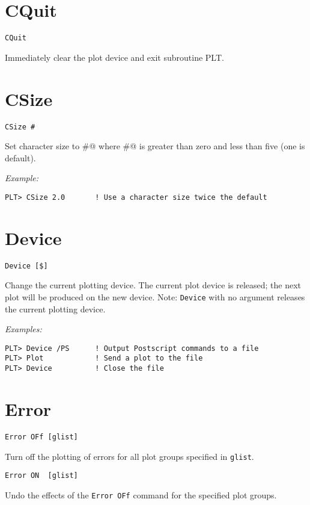 \section*{CQuit}
\begin{verbatim}
CQuit
\end{verbatim}
   Immediately clear the plot device and exit subroutine PLT.

\section*{CSize}
\begin{verbatim}
CSize #
\end{verbatim}
   Set character size to \verb@#@ where \verb@#@ is greater than zero and less than
five (one is default).

\medskip\noindent
{\em Example:}
\begin{verbatim}
PLT> CSize 2.0       ! Use a character size twice the default
\end{verbatim}

\section*{Device}
\begin{verbatim}
Device [$]
\end{verbatim}
   Change the current plotting device.  The current plot device is released;
the next plot will be produced on the new device.  Note:  {\tt Device} with
no argument releases the current plotting device.

\medskip\noindent
{\em Examples:}
\begin{verbatim}
PLT> Device /PS      ! Output Postscript commands to a file
PLT> Plot            ! Send a plot to the file
PLT> Device          ! Close the file
\end{verbatim}

\section*{Error}
\begin{verbatim}
Error OFf [glist]
\end{verbatim}
   Turn off the plotting of errors for all plot groups specified in
{\tt glist}.

\medskip
\begin{verbatim}
Error ON  [glist]
\end{verbatim}
   Undo the effects of the {\tt Error~OFf} command for the specified
plot groups.

